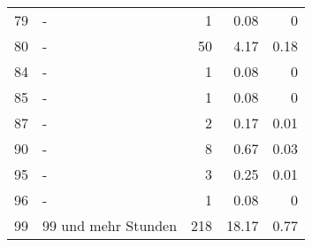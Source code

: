 \begin{longtable}{lXrrr}
        79 & \multicolumn{1}{X}{-} & %
          \num{1} &
          \num[round-mode=places,round-precision=2]{0,08} &
          \num[round-mode=places,round-precision=2]{0} \\

        80 & \multicolumn{1}{X}{-} & %
          \num{50} &
          \num[round-mode=places,round-precision=2]{4,17} &
          \num[round-mode=places,round-precision=2]{0,18} \\

        84 & \multicolumn{1}{X}{-} & %
          \num{1} &
          \num[round-mode=places,round-precision=2]{0,08} &
          \num[round-mode=places,round-precision=2]{0} \\

        85 & \multicolumn{1}{X}{-} & %
          \num{1} &
          \num[round-mode=places,round-precision=2]{0,08} &
          \num[round-mode=places,round-precision=2]{0} \\

        87 & \multicolumn{1}{X}{-} & %
          \num{2} &
          \num[round-mode=places,round-precision=2]{0,17} &
          \num[round-mode=places,round-precision=2]{0,01} \\

        90 & \multicolumn{1}{X}{-} & %
          \num{8} &
          \num[round-mode=places,round-precision=2]{0,67} &
          \num[round-mode=places,round-precision=2]{0,03} \\

        95 & \multicolumn{1}{X}{-} & %
          \num{3} &
          \num[round-mode=places,round-precision=2]{0,25} &
          \num[round-mode=places,round-precision=2]{0,01} \\

        96 & \multicolumn{1}{X}{-} & %
          \num{1} &
          \num[round-mode=places,round-precision=2]{0,08} &
          \num[round-mode=places,round-precision=2]{0} \\

        99 & \multicolumn{1}{X}{99 und mehr Stunden} & %
          \num{218} &
          \num[round-mode=places,round-precision=2]{18,17} &
          \num[round-mode=places,round-precision=2]{0,77} \\


\end{longtable}
